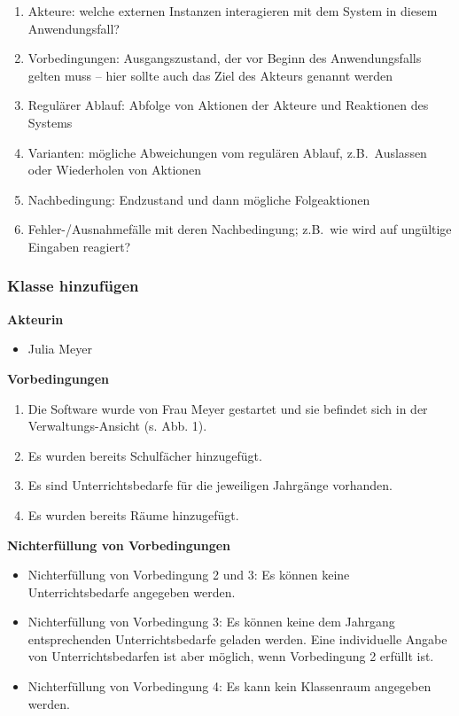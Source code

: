 \documentclass[fontsize=12pt,paper=a4,twoside]{scrartcl}
\begin{document}
{\begin{enumerate}
    \item Akteure: welche externen Instanzen interagieren mit
    dem System in diesem Anwendungsfall?  
    
    \item Vorbedingungen: Ausgangszustand, der vor Beginn des
    Anwendungsfalls gelten muss -- hier sollte auch das Ziel des Akteurs
    genannt werden
    
    \item Regulärer Ablauf: Abfolge von Aktionen der Akteure und
    Reaktionen des Systems
    
    \item Varianten: mögliche Abweichungen vom regulären Ablauf, z.B.\ 
    Auslassen oder Wiederholen von Aktionen
    
    \item Nachbedingung: Endzustand und dann mögliche Folgeaktionen 
  
    \item Fehler-/Ausnahmefälle mit deren Nachbedingung; z.B.\ wie wird
    auf ungültige Eingaben reagiert?
  \end{enumerate}
  }
\label{subsubsec:KlasseHinzufuegen}
\subsubsection{Klasse hinzufügen}

\textbf{Akteurin}
\begin{itemize}
\item Julia Meyer
\end{itemize}
\vspace{5pt}


\textbf{Vorbedingungen}
\begin{enumerate}
\item Die Software wurde von Frau Meyer gestartet und sie befindet sich in der Verwaltungs-Ansicht (s. Abb. 1).
\item Es wurden bereits Schulfächer hinzugefügt.
\item Es sind Unterrichtsbedarfe für die jeweiligen Jahrgänge vorhanden.
\item Es wurden bereits Räume hinzugefügt.
\end{enumerate}
\vspace{5pt}


\textbf{Nichterfüllung von Vorbedingungen}
\begin{itemize}
\item Nichterfüllung von Vorbedingung 2 und 3: Es können keine Unterrichtsbedarfe angegeben werden.
\item Nichterfüllung von Vorbedingung 3: Es können keine dem Jahrgang entsprechenden Unterrichtsbedarfe geladen werden. Eine individuelle Angabe von Unterrichtsbedarfen ist aber möglich, wenn Vorbedingung 2 erfüllt ist.
\item Nichterfüllung von Vorbedingung 4: Es kann kein Klassenraum angegeben werden.
\end{itemize}
\vspace{5pt}
\end{document}
